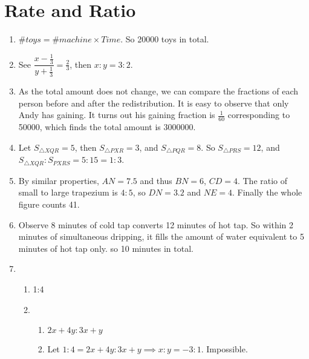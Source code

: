 \documentclass[12pt]{article}
\begin{document}
    \section{Rate and Ratio}
    \begin{enumerate}
        \item $\#toys = \#machine \times Time$. So 20000 toys in total.
        \item See $\dfrac{x-\frac{1}{3}}{y+\frac{1}{3}}=\frac{2}{3}$, then $x:y = 3:2$.
        \item As the total amount does not change, we can compare the fractions of each person before and after the redistribution. It is easy to observe that only Andy has gaining. It turns out his gaining fraction is $\frac{1}{60}$ corresponding to 50000, which finds the total amount is 3000000.
        \item Let $S_{\triangle XQR} = 5$, then $S_{\triangle PXR} = 3$, and $S_{\triangle PQR} = 8$. So $S_{\triangle PRS} = 12$, and $S_{\triangle XQR}:S_{PXRS} = 5:15 = 1:3$.
        \item By similar properties, $AN = 7.5$ and thus $BN = 6$, $CD = 4$. The ratio of small to large trapezium is $4:5$, so $DN = 3.2$ and $NE = 4$. Finally the whole figure counts 41.
        \item Observe 8 minutes of cold tap converts 12 minutes of hot tap. So within 2 minutes of simultaneous dripping, it fills the amount of water equivalent to 5 minutes of hot tap only. so 10 minutes in total.
        \item \begin{enumerate}
            \item 1:4
            \item \begin{enumerate}
                \item $2x+4y:3x+y$
                \item Let $1:4 = 2x+4y:3x+y \implies x:y = -3:1$. Impossible.
            \end{enumerate}
        \end{enumerate}
    \end{enumerate}

    \newpage
\end{document}
